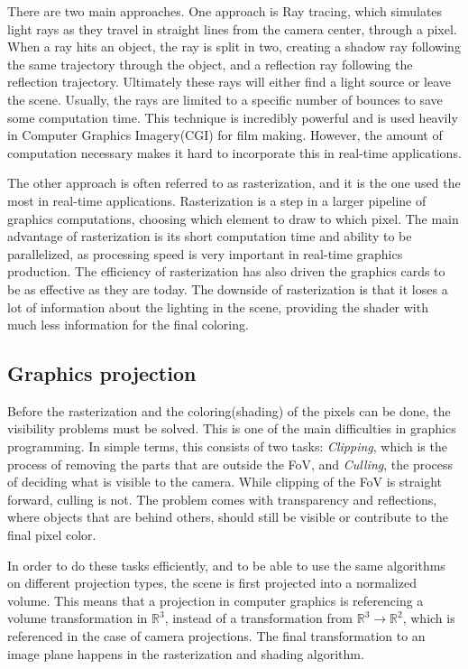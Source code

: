 There are two main approaches. One approach is Ray tracing, which simulates light rays as they travel in straight lines from the camera center, through a pixel. When a ray hits an object, the ray is split in two, creating a shadow ray following the same trajectory through the object, and a reflection ray following the reflection trajectory. Ultimately these rays will either find a light source or leave the scene. Usually, the rays are limited to a specific number of bounces to save some computation time. This technique is incredibly powerful and is used heavily in Computer Graphics Imagery(CGI) for film making. However, the amount of computation necessary makes it hard to incorporate this in real-time applications.

The other approach is often referred to as rasterization, and it is the one used the most in real-time applications. Rasterization is a step in a larger pipeline of graphics computations, choosing which element to draw to which pixel. The main advantage of rasterization is its short computation time and ability to be parallelized, as processing speed is very important in real-time graphics production. The efficiency of rasterization has also driven the graphics cards to be as effective as they are today. The downside of rasterization is that it loses a lot of information about the lighting in the scene, providing the shader with much less information for the final coloring.

\subsection{Graphics projection}

Before the rasterization and the coloring(shading) of the pixels can be done, the visibility problems must be solved. This is one of the main difficulties in graphics programming. In simple terms, this consists of two tasks: \emph{Clipping}, which is the process of removing the parts that are outside the FoV, and \emph{Culling}, the process of deciding what is visible to the camera. While clipping of the FoV is straight forward, culling is not. The problem comes with transparency and reflections, where objects that are behind others, should still be visible or contribute to the final pixel color. 

In order to do these tasks efficiently, and to be able to use the same algorithms on different projection types, the scene is first projected into a normalized volume. This means that a projection in computer graphics is referencing a volume transformation in $\mathbb{R}^3$, instead of a transformation from $\mathbb{R}^3 \rightarrow \mathbb{R}^2$, which is referenced in the case of camera projections. The final transformation to an image plane happens in the rasterization and shading algorithm.

